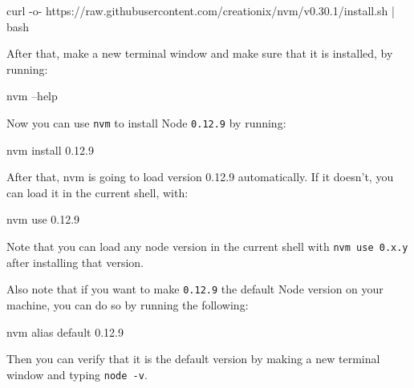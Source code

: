\documentclass[12pt,]{article}
\newenvironment{Shaded}{}{}
\newcommand{\KeywordTok}[1]{\textcolor[rgb]{0.00,0.00,1.00}{{#1}}}
\newcommand{\NormalTok}[1]{{#1}}
\begin{document}
\begin{Shaded}
\begin{Highlighting}[numbers=left,,]
\KeywordTok{curl} \NormalTok{-o- https://raw.githubusercontent.com/creationix/nvm/v0.30.1/install.sh }\KeywordTok{|} \KeywordTok{bash}
\end{Highlighting}
\end{Shaded}

After that, make a new terminal window and make sure that it is
installed, by running:

\begin{Shaded}
\begin{Highlighting}[numbers=left,,]
\KeywordTok{nvm} \NormalTok{--help}
\end{Highlighting}
\end{Shaded}

Now you can use \texttt{nvm} to install Node \texttt{0.12.9} by running:

\begin{Shaded}
\begin{Highlighting}[numbers=left,,]
\KeywordTok{nvm} \NormalTok{install 0.12.9}
\end{Highlighting}
\end{Shaded}

After that, nvm is going to load version 0.12.9 automatically. If it
doesn't, you can load it in the current shell, with:

\begin{Shaded}
\begin{Highlighting}[numbers=left,,]
\KeywordTok{nvm} \NormalTok{use 0.12.9}
\end{Highlighting}
\end{Shaded}

Note that you can load any node version in the current shell with
\texttt{nvm\ use\ 0.x.y} after installing that version.

Also note that if you want to make \texttt{0.12.9} the default Node
version on your machine, you can do so by running the following:

\begin{Shaded}
\begin{Highlighting}[numbers=left,,]
\KeywordTok{nvm} \NormalTok{alias default 0.12.9}
\end{Highlighting}
\end{Shaded}

Then you can verify that it is the default version by making a new
terminal window and typing \texttt{node\ -v}.
\end{document}
